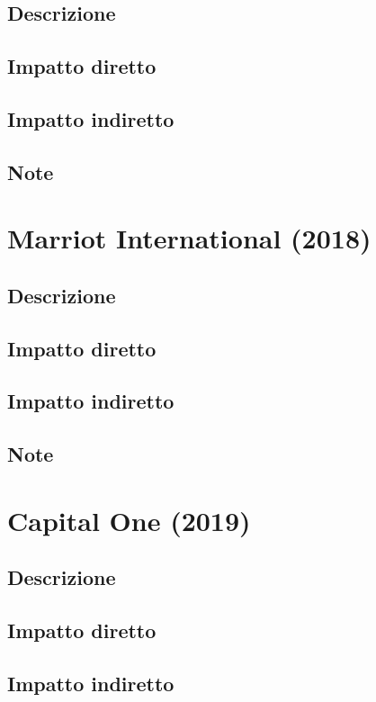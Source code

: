 \documentclass[12pt,a4paper,openright,twoside]{report}
\begin{document}
\subsection{Descrizione}

\subsection{Impatto diretto}

\subsection{Impatto indiretto}

\subsection{Note}
\section{Marriot International (2018)}
\subsection{Descrizione}

\subsection{Impatto diretto}

\subsection{Impatto indiretto}

\subsection{Note}
\section{Capital One (2019)}
\subsection{Descrizione}

\subsection{Impatto diretto}

\subsection{Impatto indiretto}
\end{document}
